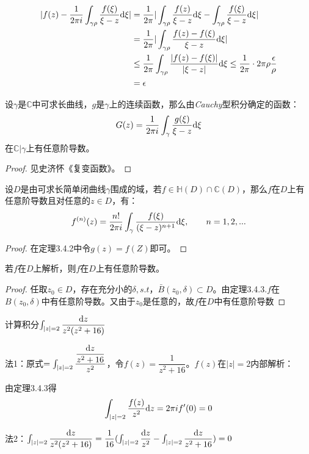 \begin{align*}
|f(z)-\dfrac{1}{2\pi i}\int_{\gamma\rho}\dfrac{f(\xi)}{\xi-z}\mathrm{d}\xi|&=\dfrac{1}{2\pi}|\int_{\gamma\rho}\dfrac{f(z)}{\xi-z}\mathrm{d}\xi-\int_{\gamma\rho}\dfrac{f(\xi)}{\xi-z}\mathrm{d}\xi|\\
&=\dfrac{1}{2\pi}|\int_{\gamma\rho}\dfrac{f(z)-f(\xi)}{\xi-z}\mathrm{d}\xi|\\
&\leq\dfrac{1}{2\pi}\int_{\gamma\rho}\dfrac{|f(z)-f(\xi)|}{|\xi-z|}\mathrm{d}\xi\leq\dfrac{1}{2\pi}\cdot 2\pi \rho\dfrac{\epsilon}{\rho}\\
&=\epsilon 
\end{align*}
\begin{mypro}
	设$\gamma$是$\mathbb{C}$中可求长曲线，$g$是$\gamma$上的连续函数，那么由\emph{Cauchy}型积分确定的函数：
	\[G(z)=\dfrac{1}{2\pi i}\int_\gamma\dfrac{g(\xi)}{\xi-z}\mathrm{d}\xi\]
	在$\mathbb{C}|\gamma$上有任意阶导数。
\end{mypro}
\begin{proof}
	{见史济怀《复变函数》。}
\end{proof}{}
\begin{mypro}
	设$D$是由可求长简单闭曲线$\gamma$围成的域，若$f\in\mathbb{H}(D)\cap\mathbb{C}(D)$，那么$f$在$D$上有任意阶导数且对任意的$z\in D$，有：
	\[f^{(n)}(z)=\dfrac{n!}{2\pi i}\int_\gamma\dfrac{f(\xi)}{(\xi-z)^{n+1}}\mathrm{d}\xi, \hspace{2em}n=1,2,...\]
\end{mypro}
\begin{proof}
	在定理3.4.2中令$g(z)=f(Z)$即可。
\end{proof}
\begin{mypro}
	若$f$在$D$上解析，则$f$在$D$上有任意阶导数。
\end{mypro}
\begin{proof}
	任取$z_0\in D$，存在充分小的$\delta,s.t$，$\bar{B}(z_0,\delta)\subset D$。由定理3.4.3.$f$在$B(z_0,\delta)$中有任意阶导数。又由于$z_0$是任意的，故$f$在$D$中有任意阶导数
\end{proof}
\begin{eg}
	计算积分$\int_{|z|=2}\dfrac{\mathrm{d}z}{z^2(z^2+16)}$
	
	法1：原式$=\int_{|z|=2}\dfrac{\dfrac{\mathrm{d}z}{z^2+16}}{z^2}$，令$f(z)=\dfrac{1}{z^2+16}$。$f(z)$在$|z|=2$内部解析：
	
	由定理3.4.3得
	\[\int_{|z|=2}\dfrac{f(z)}{z^2}\mathrm{d}z=2\pi if'(0)=0\]
	
	法2：$\int_{|z|=2}\dfrac{\mathrm{d}z}{z^2(z^2+16)}=\dfrac{1}{16}(\int_{|z|=2}\dfrac{\mathrm{d}z}{z^2}-\int_{|z|=2}\dfrac{\mathrm{d}z}{z^2+16})=0$
\end{eg}

